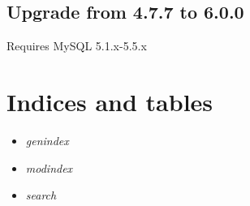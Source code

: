 \documentclass[a4paper,11pt,english]{sphinxmanual}
\begin{document}
\section{Upgrade from 4.7.7 to 6.0.0}
\label{typo3:upgrade-from-4-7-7-to-6-0-0}
Requires MySQL 5.1.x-5.5.x


\chapter{Indices and tables}
\label{index:indices-and-tables}\begin{itemize}
\item {} 
\emph{genindex}

\item {} 
\emph{modindex}

\item {} 
\emph{search}

\end{itemize}



\renewcommand{\indexname}{Index}
\printindex
\end{document}
